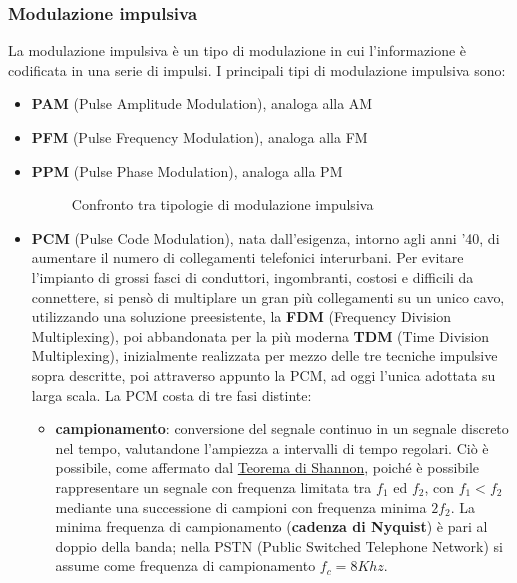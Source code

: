 \documentclass[a4paper,11pt]{article}
\def\subsub#1{\subsubsection{#1}\label{#1}}
\begin{document}
\subsub{Modulazione impulsiva}
La modulazione impulsiva è un tipo di modulazione in cui l'informazione è codificata in una serie di impulsi. I principali tipi di modulazione impulsiva sono:
\begin{itemize}
\item \textbf{PAM} (Pulse Amplitude Modulation), analoga alla AM
\item \textbf{PFM} (Pulse Frequency Modulation), analoga alla FM
\item \textbf{PPM} (Pulse Phase Modulation), analoga alla PM
\begin{figure}[h]
\centering
{}
\caption{Confronto tra tipologie di modulazione impulsiva}
\label{fig. 3}
\end{figure}
\item \textbf{PCM} (Pulse Code Modulation), nata dall'esigenza, intorno agli anni '40, di aumentare il numero di collegamenti telefonici interurbani. Per evitare l'impianto di grossi fasci di conduttori, ingombranti, costosi e difficili da connettere, si pensò di multiplare un gran più collegamenti su un unico cavo, utilizzando una soluzione preesistente, la \textbf{FDM} (Frequency Division Multiplexing), poi  abbandonata per la più moderna \textbf{TDM} (Time Division Multiplexing), inizialmente realizzata per mezzo delle tre tecniche impulsive sopra descritte, poi attraverso appunto la PCM, ad oggi l'unica adottata su larga scala. La PCM costa di tre fasi distinte:
\begin{itemize}
\item \textbf{campionamento}: conversione del segnale continuo in un segnale discreto nel tempo, valutandone l'ampiezza a intervalli di tempo regolari. Ciò è possibile, come affermato dal \href{<https://it.wikipedia.org/wiki/Teorema_del_campionamento_di_Nyquist-Shannon>}{Teorema di Shannon}, poiché è possibile rappresentare un segnale con frequenza limitata tra $f_{1}$ ed $f_{2}$, con $f_{1}<f_{2}$ mediante una successione di campioni con frequenza minima $2f_{2}$. La minima frequenza di campionamento (\textbf{cadenza di Nyquist}) è pari al doppio della banda; nella PSTN (Public Switched Telephone Network) si assume come frequenza di campionamento $f_{c}=8 Khz$.

\end{itemize}
\end{itemize}
\end{document}
